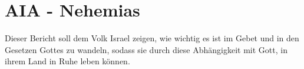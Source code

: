 \documentclass[12pt]{../../../inc/mybib}
\begin{document}
    \section{AIA - Nehemias}

    Dieser Bericht soll dem Volk Israel zeigen, wie wichtig es ist im Gebet und in den Gesetzen Gottes zu wandeln,
    sodass sie durch diese Abhängigkeit mit Gott, in ihrem Land in Ruhe leben können.
    
\end{document}
